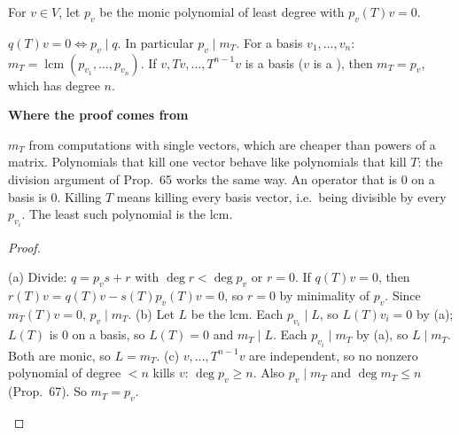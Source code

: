 \documentclass[10pt]{scrartcl}
\newenvironment{motive}{\begin{mdframed}[style=thinkbox]\textbf{\color{OliveGreen!75!black}Where the proof comes from}\begin{description}[leftmargin=0.9em,labelindent=0pt,itemsep=2pt,topsep=2pt,font=\normalfont\bfseries\color{OliveGreen!70!black}]}{\end{description}\end{mdframed}}
\newenvironment{steps}{\begin{enumerate}[label=\arabic*.,leftmargin=1.5em,itemsep=2pt,topsep=2pt]}{\end{enumerate}}
\begin{document}
\begin{proposition*}
  For $v\in V$, let $p_v$ be the monic polynomial of least degree with $p_v(T)v=0$.
  \begin{enumerate}[(a)]
    \ii $q(T)v=0\iff p_v\mid q$. In particular $p_v\mid m_T$.
    \ii For a basis $v_1,\dots,v_n$: $m_T=\operatorname{lcm}(p_{v_1},\dots,p_{v_n})$.
    \ii If $v,Tv,\dots,T^{n-1}v$ is a basis ($v$ is a ), then $m_T=p_v$, which has degree $n$.
  \end{enumerate}
\end{proposition*}
\begin{motive}
  \ii[Want.] $m_T$ from computations with single vectors, which are cheaper than powers of a matrix.
  \ii[Know.] Polynomials that kill one vector behave like polynomials that kill $T$: the division argument of Prop.~65 works the same way. An operator that is $0$ on a basis is $0$.
   Killing $T$ means killing every basis vector, i.e.\ being divisible by every $p_{v_i}$. The least such polynomial is the lcm.
\end{motive}
\begin{proof}
  \begin{steps}
    \ii (a) Divide: $q=p_vs+r$ with $\deg r<\deg p_v$ or $r=0$. If $q(T)v=0$, then $r(T)v=q(T)v-s(T)p_v(T)v=0$, so $r=0$ by minimality of $p_v$. Since $m_T(T)v=0$, $p_v\mid m_T$.
    \ii (b) Let $L$ be the lcm. Each $p_{v_i}\mid L$, so $L(T)v_i=0$ by (a); $L(T)$ is $0$ on a basis, so $L(T)=0$ and $m_T\mid L$.
    \ii Each $p_{v_i}\mid m_T$ by (a), so $L\mid m_T$. Both are monic, so $L=m_T$.
    \ii (c) $v,\dots,T^{n-1}v$ are independent, so no nonzero polynomial of degree $<n$ kills $v$: $\deg p_v\ge n$. Also $p_v\mid m_T$ and $\deg m_T\le n$ (Prop.~67). So $m_T=p_v$.
  \end{steps}
\end{proof}
\end{document}

